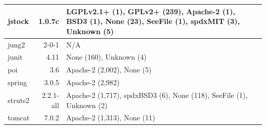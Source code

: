 \documentclass{sig-alternate-05-2015}
\begin{document}
\begin{table}
\begin{tabular}{l|r|p{4cm}}
		jstock & 1.0.7c & LGPLv2.1+ (1), \newline GPLv2+ (239), \newline Apache-2 (1), BSD3 (1), \newline None (23), SeeFile (1), \newline spdxMIT (3), Unknown (5)\\
		\hline
		jung2 & 2-0-1 & N/A \\
		\hline
		junit & 4.11 & None (160), Unknown (4)  \\
		\hline
		poi & 3.6 & Apache-2 (2,002), None (5) \\
		\hline
		spring & 3.0.5 & Apache-2 (2,982) \\
		\hline
		struts2 & 2.2.1-all & Apache-2 (1,717), \newline spdxBSD3 (6), \newline None (118), SeeFile (1), \newline Unknown (2) \\
		\hline
		tomcat & 7.0.2 & Apache-2 (1,313), None (11) \\
		\hline
	\end{tabular} %
\end{table}
\end{document}
